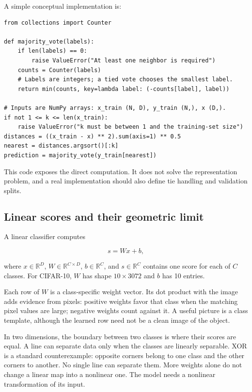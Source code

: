 A simple conceptual implementation is:

\begin{verbatim}
from collections import Counter

def majority_vote(labels):
    if len(labels) == 0:
        raise ValueError("At least one neighbor is required")
    counts = Counter(labels)
    # Labels are integers; a tied vote chooses the smallest label.
    return min(counts, key=lambda label: (-counts[label], label))

# Inputs are NumPy arrays: x_train (N, D), y_train (N,), x (D,).
if not 1 <= k <= len(x_train):
    raise ValueError("k must be between 1 and the training-set size")
distances = ((x_train - x) ** 2).sum(axis=1) ** 0.5
nearest = distances.argsort()[:k]
prediction = majority_vote(y_train[nearest])
\end{verbatim}

This code exposes the direct computation. It does not solve the representation problem, and a real implementation should also define tie handling and validation splits.

\subsection{Linear scores and their geometric limit}\label{04-visual-computing-ii-ch031-linear-scores-and-their-geometric-limit}

\hypertarget{04-visual-computing-ii-ch031-linear-scores-and-their-geometric-limit}{}

A linear classifier computes

\[s=Wx+b,\]

where \(x\in\mathbb{R}^{D}\), \(W\in\mathbb{R}^{C\times D}\), \(b\in\mathbb{R}^{C}\), and \(s\in\mathbb{R}^{C}\) contains one score for each of \(C\) classes. For CIFAR-10, \(W\) has shape \(10\times3072\) and \(b\) has 10 entries.

Each row of \(W\) is a class-specific weight vector. Its dot product with the image adds evidence from pixels: positive weights favor that class when the matching pixel values are large; negative weights count against it. A useful picture is a class template, although the learned row need not be a clean image of the object.

In two dimensions, the boundary between two classes is where their scores are equal. A line can separate data only when the classes are linearly separable. XOR is a standard counterexample: opposite corners belong to one class and the other corners to another. No single line can separate them. More weights alone do not change a linear map into a nonlinear one. The model needs a nonlinear transformation of its input.

